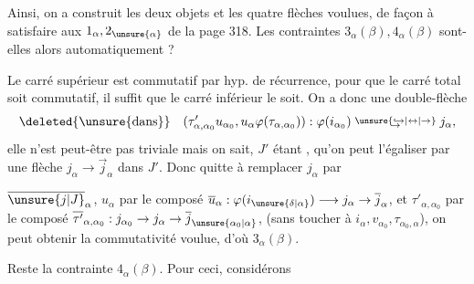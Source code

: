 Ainsi, on a construit les deux objets et les quatre flèches voulues, de façon à satisfaire aux  $1_\alpha,2_{\unsure{\alpha}}$ de la page 318. Les contraintes $3_\alpha(\beta),4_\alpha(\beta)$ sont-elles alors  automatiquement ?


Le carré supérieur est commutatif par hyp. de récurrence, pour  que le carré total  soit commutatif, il suffit  que le carré inférieur le soit. On a donc une double-flèche
\[
\deleted{\unsure{\text{dans}}}\quad(\tau'_{\alpha,\alpha_0}u_{\alpha_0},u_\alpha\varphi(\tau_{\alpha,\alpha_0})):\varphi(i_{\alpha_0})\mathrel{\substack{\unsure{\hookrightarrow|\leftrightarrow|\rightarrow}\\[-.55ex]\rightarrow}}j_\alpha,
\]
elle n'est peut-être pas triviale mais on sait, $J'$ étant , qu'on peut l'égaliser par une flèche $j_\alpha\to\overrightarrow{j}_\alpha$ dans $J'$. Donc quitte à remplacer $j_\alpha$ par

 $\overline{\unsure{j|J}}_\alpha$, $u_\alpha$ par le composé $\overline{u}_\alpha:\varphi(i_{\unsure{\delta|\alpha}})\longrightarrow j_\alpha\to\overline{j}_\alpha$, et $\tau'_{\alpha,\alpha_0}$ par le composé $\overline{\tau'}_{\alpha,\alpha_0}:j_{\alpha_0}\to j_\alpha\to\overline{j}_{\unsure{\alpha_0|\alpha}}$, (sans toucher à $i_\alpha,v_{\alpha_0},\tau_{\alpha_0,\alpha}$), on peut obtenir la commutativité voulue, d'où  $3_\alpha(\beta)$.

Reste la contrainte $4_\alpha(\beta)$. Pour ceci, considérons   

